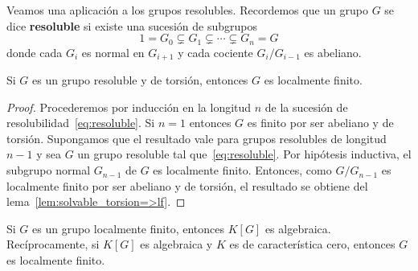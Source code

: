Veamos una aplicación a los grupos resolubles. Recordemos que un grupo $G$ se
dice \textbf{resoluble} si existe una sucesión de subgrupos 
\begin{equation}
	\label{eq:resoluble}
	1=G_0\subsetneq G_1\subsetneq \cdots\subsetneq G_n=G
\end{equation}
donde cada $G_i$ es normal en $G_{i+1}$ y cada cociente $G_i/G_{i-1}$ es
abeliano.

\begin{proposition}
	Si $G$ es un grupo resoluble y de torsión, entonces $G$ es localmente
	finito.
\end{proposition}

\begin{proof}
	Procederemos por inducción en la longitud $n$ de la sucesión de
	resolubilidad~\eqref{eq:resoluble}. Si $n=1$ entonces $G$ es finito por ser
	abeliano y de torsión. Supongamos que el resultado vale para grupos
	resolubles de longitud $n-1$ y sea $G$ un grupo resoluble tal
	que~\eqref{eq:resoluble}. Por hipótesis inductiva, el subgrupo normal
	$G_{n-1}$ de $G$ es localmente finito. Entonces, como $G/G_{n-1}$ es
	localmente finito por ser abeliano y de torsión, el resultado se obtiene
	del lema~\ref{lem:solvable_torsion=>lf}.
\end{proof}

\begin{theorem}[Herstein]
	Si $G$ es un grupo localmente finito, entonces $K[G]$ es algebraica.
	Recíprocamente, si $K[G]$ es algebraica y $K$ es de característica cero,
	entonces $G$ es localmente finito.
\end{theorem}

